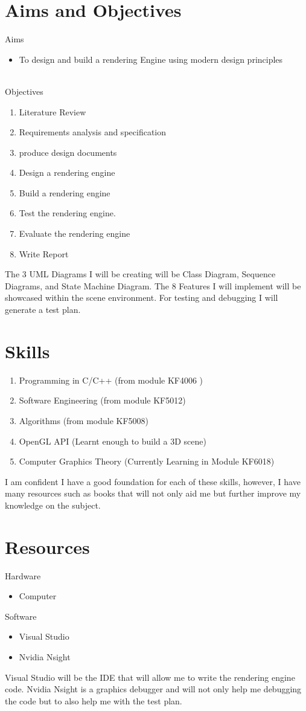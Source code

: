 \documentclass[]{article}
\begin{document}
\section{Aims and Objectives}
Aims
\begin{itemize}
  \item To design and build a rendering Engine using modern design principles
\end{itemize}
\\
Objectives
\begin{enumerate}
  \item Literature Review 
  \item Requirements analysis and specification
  \item produce design documents
  \item Design a rendering engine
  \item Build a rendering engine
  \item Test the rendering engine.
  \item Evaluate the rendering engine
  \item Write Report
\end{enumerate}
The 3 UML Diagrams I will be creating will be Class Diagram, Sequence Diagrams, and State Machine Diagram. The 8 Features I will implement will be showcased within the scene environment. For testing and debugging I will generate a test plan.
\section{Skills}
\begin{enumerate}
    \item Programming in C/C++ (from module KF4006 )
    \item Software Engineering (from module KF5012)
    \item Algorithms (from module KF5008) 
    \item OpenGL API (Learnt enough to build a 3D scene) 
    \item Computer Graphics Theory (Currently Learning in Module KF6018)
\end{enumerate}
I am confident I have a good foundation for each of these skills, however, I have many resources such as books that will not only aid me but further improve my knowledge on the subject. 
\section{Resources}
Hardware
\begin{itemize}
  \item Computer
  
\end{itemize}
Software
\begin{itemize}
  \item Visual Studio
  \item Nvidia Nsight
\end{itemize}
Visual Studio will be the IDE that will allow me to write the rendering engine code.
Nvidia Nsight is a graphics debugger and will not only help me debugging the code but to also help me with the test plan.
\end{document}
